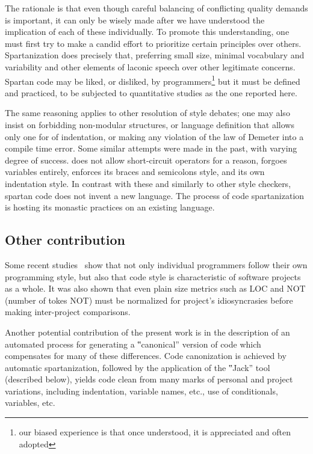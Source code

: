 The rationale is that even though careful balancing of conflicting quality
  demands is important, it can only be wisely made after we have understood the
  implication of each of these individually.
To promote this understanding, one must first try to make a candid effort to
  prioritize certain principles over others.
Spartanization does precisely that, preferring small size, minimal vocabulary
  and variability and other elements of laconic speech over other legitimate 
  concerns.
Spartan code may be liked, or disliked, by programmers\footnote{our biased experience
  is that once understood, it is appreciated and often adopted} but it must be
  defined and practiced, to be subjected to quantitative studies as the one
  reported here.

The same reasoning applies to other resolution of style debates; one may also
  insist on forbidding non-modular structures, or language definition that
  allows only one for of indentation, or making any violation of the law of
  Demeter into a compile time error.
Some similar attempts were made in the past, with varying degree of success.
\Pascal does not allow short-circuit operators for a reason, \Haskell forgoes
variables entirely, \Go enforces its braces and semicolons style,
and \Python its own indentation style. In contrast with these and similarly to
other style checkers, spartan code does not invent a new language. 
The process of code spartanization is hosting its monastic practices on an
existing language. 

\subsection{Other contribution}

Some recent studies~\cite{%
  Gil:Lalouche:16,%
  Goldstein:Moshkovich:2011,
  Zhang:Zheng:Ying:Hassan:2016,
} show that not only individual programmers follow their own programming style,
but also that code style is characteristic of software projects as a whole. It
was also shown that even plain size metrics such as LOC and NOT (number of
tokes NOT) must be normalized for project's idiosyncrasies before making
inter-project comparisons.

Another potential contribution of the present work is in the description of an
automated process for generating a ‟canonical” version of code which
compensates for many of these differences. Code canonization is achieved by
automatic spartanization, followed by the application of the ‟Jack” tool
(described below), yields code clean from many marks of personal and project
variations, including indentation, variable names, etc., use of conditionals,
variables, etc.

